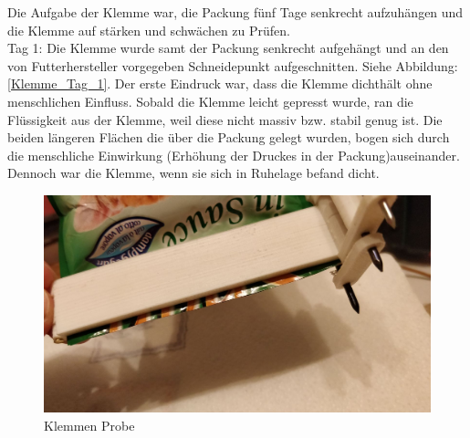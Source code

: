 Die Aufgabe der Klemme war, die Packung fünf Tage senkrecht aufzuhängen und die Klemme auf stärken und schwächen zu Prüfen.\\

Tag 1: Die Klemme wurde samt der Packung senkrecht aufgehängt und an den von Futterhersteller vorgegeben Schneidepunkt aufgeschnitten. Siehe Abbildung: \ref{Klemme_Tag_1}. Der erste Eindruck war, dass die Klemme dichthält ohne menschlichen Einfluss. Sobald die Klemme leicht gepresst wurde, ran die Flüssigkeit aus der Klemme, weil diese nicht massiv bzw. stabil genug ist. Die beiden längeren Flächen die über die Packung gelegt wurden, bogen sich durch die menschliche Einwirkung (Erhöhung der Druckes in der Packung)auseinander. Dennoch war die Klemme, wenn sie sich in Ruhelage befand dicht.

\begin{figure}[H]
   \begin{minipage}[hbt]{.5\linewidth} %
      \includegraphics[width=\linewidth]{Bilder/Dichtheitsexperiment/Probe}
      \caption{Klemmen Probe}
      \label{Klemmen_Probe} 
   \end{minipage}
   \hspace{.2\linewidth}%
   \begin{minipage}[hbt]{.3\linewidth} %

\end{minipage}
\end{figure}
